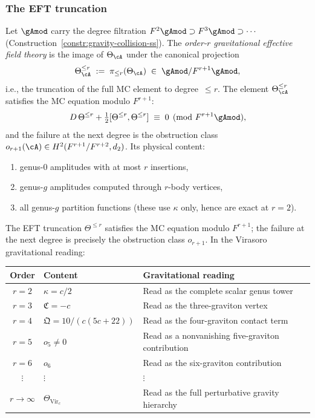 \subsubsection*{The EFT truncation}

\begin{definition}
\label{def:gravity-eft}
Let $\gAmod$ carry the degree filtration
$F^2\gAmod \supset F^3\gAmod \supset \cdots$
\textup{(}Construction~\textup{\ref{constr:gravity-collision-ss}}\textup{)}.
The \emph{order-$r$ gravitational effective field theory} is the
image of $\Theta_\cA$ under the canonical projection
\[
\Theta_\cA^{\le r}
\;:=\;
\pi_{\le r}(\Theta_\cA)
\;\in\;
\gAmod / F^{r+1}\gAmod,
\]
i.e., the truncation of the full MC element to
degree~$\le r$. The element $\Theta_\cA^{\le r}$ satisfies the
MC equation modulo $F^{r+1}$:
\[
D\,\Theta^{\le r}
+ \tfrac{1}{2}[\Theta^{\le r}, \Theta^{\le r}]
\;\equiv\; 0 \pmod{F^{r+1}\gAmod},
\]
and the failure at the next degree is the obstruction class
$o_{r+1}(\cA) \in H^2(F^{r+1}/F^{r+2}, d_2)$.
Its physical content:
\begin{enumerate}[label=\textup{--}]
\item genus-$0$ amplitudes with at most $r$ insertions,
\item genus-$g$ amplitudes computed through $r$-body vertices,
\item all genus-$g$ partition functions (these use $\kappa$ only,
 hence are exact at $r = 2$).
\end{enumerate}
\end{definition}

The EFT truncation $\Theta^{\le r}$ satisfies the MC equation
modulo $F^{r+1}$; the failure at the next degree is precisely the
obstruction class $o_{r+1}$. In the Virasoro gravitational reading:
\begin{center}
\small
\renewcommand{\arraystretch}{1.15}
\begin{tabular}{cll}
\textbf{Order} & \textbf{Content} & \textbf{Gravitational reading} \\
\hline
$r = 2$ & $\kappa = c/2$ & Read as the complete scalar genus tower \\
$r = 3$ & $\mathfrak{C} = -c$ & Read as the three-graviton vertex \\
$r = 4$ & $\mathfrak{Q} = 10/(c(5c+22))$
 & Read as the four-graviton contact term \\
$r = 5$ & $o_5 \ne 0$ & Read as a nonvanishing five-graviton contribution \\
$r = 6$ & $o_6$ & Read as the six-graviton contribution \\
$\vdots$ & $\vdots$ & $\vdots$ \\
$r \to \infty$ & $\Theta_{\mathrm{Vir}_c}$ & Read as the full perturbative gravity hierarchy
\end{tabular}
\end{center}

